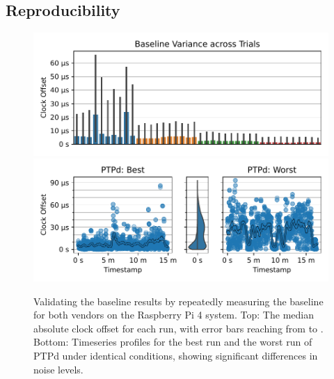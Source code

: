 \subsection{Reproducibility}

\begin{figure}
    \centering
    \includegraphics[width=\linewidth]{res/generated/base/key_metric_variance_rpi-4.pdf}
    \includegraphics[width=\linewidth]{res/generated/base/ptpd-good-vs-bad.pdf}

    \legend
    \caption{Validating the baseline results by repeatedly measuring the baseline for both vendors on the Raspberry Pi 4 system. Top: The median absolute clock offset for each run, with error bars reaching from \PFive{} to \PNineFive{}. Bottom: Timeseries profiles for the best run and the worst run of PTPd under identical conditions, showing significant differences in noise levels.}
    \label{fig:baseline_reproducibility}
\end{figure}


\newcommand{\numBaselineMeasurements}{10}
\newcommand{\baselineTotalMinutesRuntime}{\numBaselineMeasurements*4*2*20}
\newcommand{\numSamplesPerRunApprox}{\fpeval{round(20*60)}}


